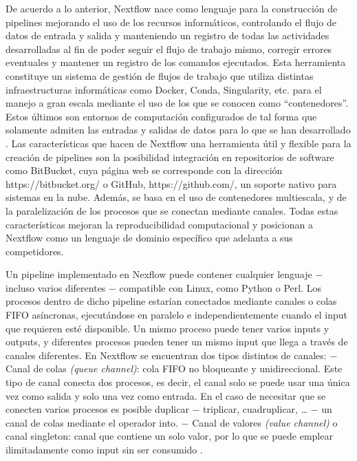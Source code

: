\documentclass[12pt]{article}
\begin{document}
De acuerdo a lo anterior, Nextflow nace como lenguaje para la construcción de 
pipelines mejorando el uso de los recursos informáticos, controlando el 
flujo de datos de entrada y salida y manteniendo un registro de todas las 
actividades desarrolladas al fin de poder seguir el flujo de trabajo mismo, 
corregir errores eventuales y mantener un registro de los comandos ejecutados. 
Esta herramienta constituye un sistema de gestión de flujos de trabajo que utiliza 
distintas infraestructuras informáticas como Docker, Conda, Singularity, etc. 
para el manejo a gran escala mediante el uso de los que se conocen como “contenedores”. 
Estos últimos son entornos de computación configurados de tal forma que 
solamente admiten las entradas y salidas de datos para lo que se han 
desarrollado \cite{Lomas}. Las características que hacen de Nextflow una 
herramienta útil y flexible para la creación de pipelines son la posibilidad 
integración en repositorios de software como BitBucket, cuya página web se 
corresponde con la dirección https://bitbucket.org/ o GitHub, https://github.com/, 
un soporte nativo para sistemas en la nube. Además, se basa en el uso de 
contenedores multiescala, y de la paralelización de los procesos que se 
conectan mediante canales. Todas estas características mejoran la 
reproducibilidad computacional y posicionan a Nextflow como un lenguaje de 
dominio específico que adelanta a sus competidores. 

Un pipeline implementado en Nexflow puede contener cualquier 
lenguaje $-$ incluso varios diferentes $-$ compatible con Linux, como Python 
o Perl. Los procesos dentro de dicho pipeline estarían conectados mediante 
canales o colas FIFO asíncronas, ejecutándose en paralelo e independientemente 
cuando el input que requieren esté disponible. Un mismo proceso puede tener varios 
inputs y outputs, y diferentes procesos pueden tener un mismo input que llega a 
través de canales diferentes. En Nextflow se encuentran dos tipos distintos de 
canales: $-$ Canal de colas \emph{(queue channel)}: cola FIFO no bloqueante 
y unidireccional. Este tipo de canal conecta dos procesos, es decir, el 
canal solo se puede usar una única vez como salida y solo una vez como 
entrada. En el caso de necesitar que se conecten varios procesos es posible 
duplicar $-$ triplicar, cuadruplicar, … $-$ un canal de colas mediante el 
operador into. $-$ Canal de valores \emph{(value channel)} o canal singleton: canal 
que contiene un solo valor, por lo que se puede emplear ilimitadamente 
como input sin ser consumido \cite{Lomas}.
\end{document}

